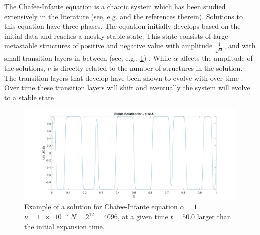 \documentclass[12pt]{amsart}
\theoremstyle{plain}
\theoremstyle{definition}
\theoremstyle{remark}
\numberwithin{equation}{section} %
\numberwithin{figure}{section}   %
\begin{document}
The Chafee-Infante equation is a chaotic system which has been studied extensively in the literature (see, e.g. \cite{Cohen_2000,Ward_1996,Shen_2010,Grant_1995} and the references therein). Solutions to this equation have three phases. The equation initially develops based on the initial data and reaches a mostly stable state. This state consists of large metastable structures of positive and negative value with amplitude $\frac{1}{\sqrt{\alpha}}$, and with small transition layers in between (see, e.g., \cref{fig:example}) \cite{Ward_1996}.  While $\alpha$ affects the amplitude of the solutions, $\nu$ is directly related to the number of structures in the solution. The transition layers that develop have been shown to evolve with over time \cite{Ward_1996}. Over time these transition layers will shift and eventually the system will evolve to a stable state \cite{Shirakawa_2005}.


\begin{figure}
	\centering
	\includegraphics[scale=0.15]{Example.jpg}
	\caption{Example of a solution for Chafee-Infante equation $\alpha = 1$ $\nu=\num{1e-5}$  $N = 2^{12}=4096$, at a given time $t=50.0$ larger than the initial expansion time.}
	\label{fig:example}
\end{figure}


%
 
\end{document}
